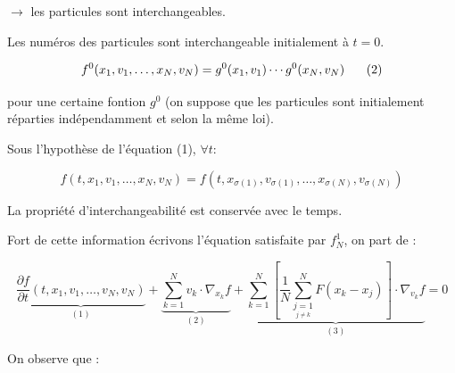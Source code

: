 \documentclass[12pt,a4paper]{article}
\begin{document}
	$\rightarrow$ les particules sont interchangeables.
	
	Les numéros des particules sont interchangeable initialement à $t = 0$.
	
	\[
	f^0(x_1,v_1,\ldots,x_N,v_N) = g^0(x_1,v_1)\cdots g^0(x_N,v_N) \text{\hspace{.5cm} (2)}
	\]
	
	pour une certaine fontion $g^0$ (on suppose que les particules sont initialement réparties indépendamment et selon la même loi).
	
	\begin{thm}
		\begin{minipage}[t]{10cm}
			Sous l'hypothèse de l'équation (1), $\forall t$:
		\end{minipage}
		
		\[
		f(t,x_1,v_1,\ldots,x_N,v_N) = f(t,x_{\sigma(1)},v_{\sigma(1)},\ldots,x_{\sigma(N)},v_{\sigma(N)})
		\]
		
		La propriété d'interchangeabilité est conservée avec le temps.
	\end{thm}
	
	Fort de cette information écrivons l'équation satisfaite par $f_N^1$, on part de :
	
	\[
	\underbrace{\dfrac{\partial f}{\partial t}(t,x_1,v_1,\ldots,v_N,v_N)}_{(1)} + \underbrace{\displaystyle\sum_{k=1}^N v_k \cdot \nabla_{x_k} f}_{(2)} + \underbrace{\sum_{k=1}^N \left[\frac{1}{N} \sum_{\underset{j\not=k}{j=1}}^N F(x_k-x_j)\right]\cdot\nabla_{v_k}f}_{(3)} = 0
	\]
	
	On observe que :
	
\end{document}
